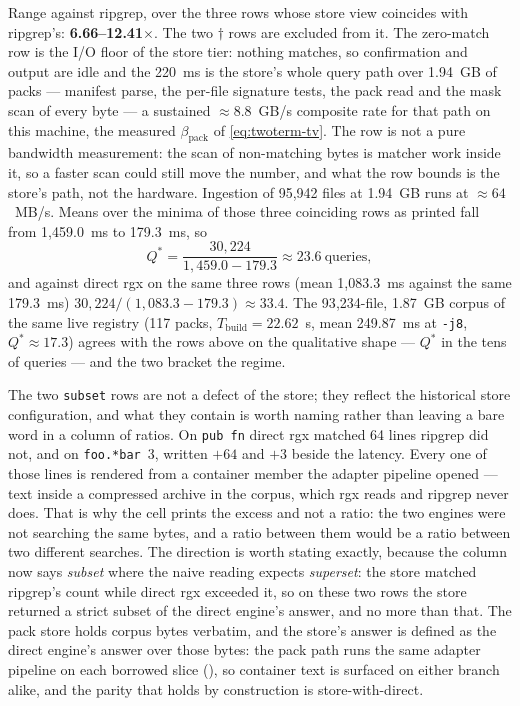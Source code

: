 \documentclass[11pt,letterpaper]{article}
\begin{document}
Range against ripgrep, over the three rows whose store view coincides with
ripgrep's: \textbf{6.66--12.41$\times$}. The two $\dagger$ rows are excluded
from it. The zero-match row is
the I/O floor of the store tier: nothing matches, so confirmation and
output are idle and the 220~ms is the store's whole query path over
1.94~GB of packs --- manifest parse, the per-file signature tests, the pack
read and the mask scan of every byte --- a sustained $\approx 8.8$~GB/s
composite rate for that path on this machine, the measured
$\beta_{\text{pack}}$ of \eqref{eq:twoterm-tv}. The row is not a pure
bandwidth measurement: the scan of non-matching bytes is matcher work
inside it, so a faster scan could still move the number, and what the row
bounds is the store's path, not the hardware. Ingestion of 95{,}942 files
at 1.94~GB runs at $\approx 64$~MB/s. Means over the minima of those three
coinciding rows as printed fall from 1{,}459.0~ms to 179.3~ms, so
\begin{equation}
Q^{*} = \frac{30{,}224}{1{,}459.0-179.3} \approx 23.6 \ \text{queries},
\end{equation}
and against direct rgx on the same three rows (mean 1{,}083.3~ms against the
same 179.3~ms) $30{,}224/(1{,}083.3-179.3)\approx 33.4$. The
93{,}234-file, 1.87~GB corpus of the same live registry (117 packs,
$T_{\text{build}}=22.62$~s, mean 249.87~ms at \texttt{-j8},
$Q^{*}\approx 17.3$) agrees with the rows above on the qualitative shape
--- $Q^{*}$ in the tens of queries --- and the two bracket the regime.

The two \texttt{subset} rows are not a defect of the store; they reflect the
historical store configuration, and what they contain is worth naming rather than leaving
a bare word in a column of ratios. On \texttt{pub fn} direct rgx matched 64
lines ripgrep did not, and on \texttt{foo.*bar}~3, written $+64$ and $+3$
beside the latency. Every one of those lines is rendered from a container
member the adapter pipeline opened --- text inside a compressed archive in
the corpus, which rgx reads and ripgrep never does. That is why the cell
prints the excess and not a ratio: the two engines were not searching the
same bytes, and a ratio between them would be a ratio between two different
searches. The direction is worth stating exactly, because the column now
says \emph{subset} where the naive reading expects \emph{superset}: the store
matched ripgrep's count while direct rgx exceeded it, so on these two rows
the store returned a strict subset of the direct engine's answer, and no more
than that. The pack store holds corpus bytes verbatim, and the store's answer
is defined as the direct engine's answer over those bytes: the pack path runs
the same adapter pipeline on each borrowed slice (),
so container text is surfaced on either branch alike, and the parity that
holds by construction is store-with-direct.
\end{document}
